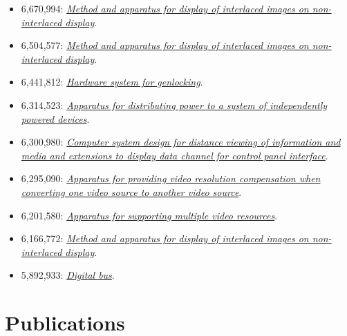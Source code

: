 \documentclass[10pt,letterpaper,oneside]{report}
\begin{document}
\begin{itemize}
  \item 6,670,994: \href{http://voltz.ws/resume/6670994.pdf}{\textit{Method and apparatus for display of interlaced images on non-interlaced display}}.

  \item 6,504,577: \href{http://voltz.ws/resume/6504577.pdf}{\textit{Method and apparatus for display of interlaced images on non-interlaced display}}.

  \item 6,441,812: \href{http://voltz.ws/resume/6441812.pdf}{\textit{Hardware system for genlocking}}.

  \item 6,314,523: \href{http://voltz.ws/resume/6314523.pdf}{\textit{Apparatus for distributing power to a system of independently powered devices}}.

  \item 6,300,980: \href{http://voltz.ws/resume/6300980.pdf}{\textit{Computer system design for distance viewing of information and media and extensions to display data channel for control panel interface}}.

  \item 6,295,090: \href{http://voltz.ws/resume/6295090.pdf}{\textit{Apparatus for providing video resolution compensation when converting one video source to another video source}}.

  \item 6,201,580: \href{http://voltz.ws/resume/6201580.pdf}{\textit{Apparatus for supporting multiple video resources}}.

  \item 6,166,772: \href{http://voltz.ws/resume/6166772.pdf}{\textit{Method and apparatus for display of interlaced images on non-interlaced display}}.

  \item 5,892,933: \href{http://voltz.ws/resume/5892933.pdf}{\textit{Digital bus}}.
\end{itemize}

\section{Publications}
\end{document}
